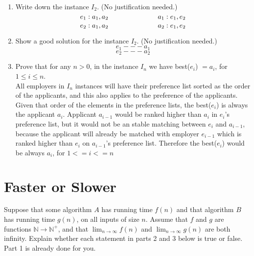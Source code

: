\documentclass[11pt]{article}
\def\ans#1{{\color{ans}#1}}
\begin{document}
\begin{enumerate}
\item Write down the instance $I_2$. (No justification needed.)
\ans{
  \[
  e_1: a_1, a_2  \mbox{\hspace{1in}}
  a_1: e_1, e_2 
  \]
  \[
  e_2: a_1, a_2  \mbox{\hspace{1in}}
  a_2: e_1, e_2
  \]
}

\item Show a good solution for the instance $I_2$. (No justification needed.)
\ans{
  \[
    e_1 --- a_1
  \]
  \[
    e_2 --- a_2
  \]
}

\item Prove that for any $n>0$, in the instance $I_n$ we have best($e_i$) $= a_i$,
for $1 \le i \le n$. \\
\ans{
  All employers in $I_n$ instances will have their preference list sorted as the order of the 
  applicants, and this also applies to the preference of the applicants. Given that order of the elements
  in the preference lists, the best($e_i$) is always the applicant $a_i$.
  Applicant $a_{i-1}$ would be ranked higher than $a_i$ in $e_i$'s preference list, but it would not
  be an stable matching between $e_i$ and $a_{i-1}$, because the applicant will already be matched with
  employer $e_{i-1}$ which is ranked higher than $e_i$ on $a_{i-1}$'s preference list. Therefore the 
  best($e_i$) would be always $a_i$, for $1 <= i <= n$
}
\end{enumerate}

\section{Faster or Slower}
\label{sec-4}
Suppose that some algorithm $A$ has running time $f(n)$ and that
algorithm $B$ has running time $g(n)$, on all inputs of size $n$.
Assume that $f$ and $g$ are functions $\mathbb{N} \rightarrow \mathbb{N}^+$, and that
$\lim_{n \rightarrow \infty} f(n)$ and $\lim_{n \rightarrow \infty} g(n)$ are both infinity.
Explain whether each statement in parts 2 and 3 below is true or false.
Part 1 is already done for you.
\end{document}
